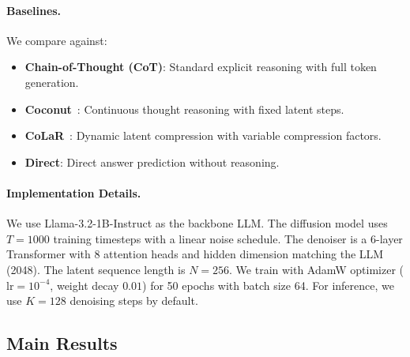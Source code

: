 \documentclass{article}
\begin{document}
\paragraph{Baselines.}
We compare against:
\begin{itemize}
    \item \textbf{Chain-of-Thought (CoT)}: Standard explicit reasoning with full token generation.
    \item \textbf{Coconut}~\citep{hao2024training}: Continuous thought reasoning with fixed latent steps.
    \item \textbf{CoLaR}~\citep{tan2025colar}: Dynamic latent compression with variable compression factors.
    \item \textbf{Direct}: Direct answer prediction without reasoning.
\end{itemize}

\paragraph{Implementation Details.}
We use Llama-3.2-1B-Instruct as the backbone LLM. The diffusion model uses $T=1000$ training timesteps with a linear noise schedule. The denoiser is a 6-layer Transformer with 8 attention heads and hidden dimension matching the LLM (2048). The latent sequence length is $N=256$. We train with AdamW optimizer ($\text{lr}=10^{-4}$, weight decay $0.01$) for 50 epochs with batch size 64. For inference, we use $K=128$ denoising steps by default.

\subsection{Main Results}
\label{sec:main_results}
\end{document}
